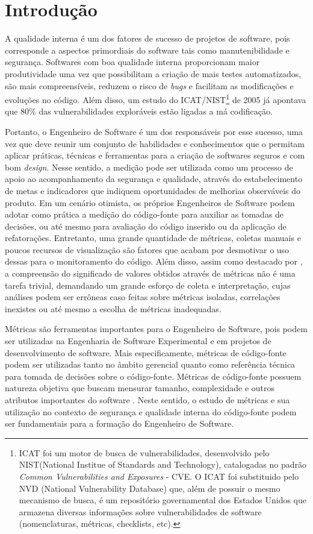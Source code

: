 \section{Introdução}
\label{introduction}

A qualidade interna é um dos fatores de sucesso de projetos de software, pois corresponde a aspectos primordiais do software tais como manutenibilidade e segurança. Softwares com boa qualidade interna proporcionam maior produtividade uma vez que possibilitam a criação de mais testes automatizados, são mais compreensíveis, reduzem o risco de \emph{bugs} e facilitam as modificações e evoluções no código. Além disso, um estudo do ICAT/NIST\footnote{ICAT foi um motor de busca de vulnerabilidades, desenvolvido pelo NIST(National Institue of Standards and Technology), catalogadas no padrão \emph{Common Vulnerabilities and Exposures} - CVE. O ICAT foi substituido pelo NVD (National Vulnerability Database) que, além de possuir o mesmo mecanismo de busca, é um repositório governamental dos Estados Unidos que armazena diversas informações sobre vulnerabilidades de software (nomenclaturas, métricas, checklists, etc).} de 2005 já apontava que 80\% das vulnerabilidades exploráveis estão ligadas a má codificação.

Portanto, o Engenheiro de Software é um dos responsáveis por esse sucesso, uma vez que deve reunir um conjunto de habilidades e conhecimentos que o permitam aplicar práticas, técnicas e ferramentas para a criação de softwares seguros e com bom \emph{design}. Nesse sentido, a medição pode ser utilizada como um processo de apoio ao acompanhamento da segurança e qualidade, através do estabelecimento de metas e indicadores que indiquem oportunidades de melhorias observáveis do produto. Em um cenário otimista,
os próprios Engenheiros de Software podem adotar como prática a medição do código-fonte para auxiliar as tomadas de decisões, ou até mesmo para avaliação do código inserido ou da aplicação de refatorações. Entretanto, uma grande quantidade de métricas, coletas manuais e poucos recursos de visualização são fatores que acabam por desmotivar o uso dessas para o monitoramento do código. Além disso, assim como destacado por \cite{chidamber1994}, a compreensão do significado de valores obtidos através de métricas não é uma tarefa trivial, demandando um grande esforço de coleta e interpretação, cujas análises podem ser errôneas caso feitas sobre métricas isoladas, correlações inexistes ou até mesmo a escolha de métricas inadequadas.

Métricas são ferramentas importantes para o Engenheiro de Software, pois podem ser utilizadas na Engenharia de Software Experimental \cite{hegedus2012} e em projetos de desenvolvimento de software. Mais especificamente, métricas de código-fonte podem ser utilizadas tanto no âmbito gerencial quanto como referência técnica para tomada de decisões sobre o código-fonte. Métricas de código-fonte possuem natureza objetiva que buscam mensurar tamanho, complexidade e outros atributos importantes do software \cite{henry1984kafura}\cite{troy1981zweben}\cite{yau1985zweben}\cite{systa2000}. Neste sentido, o estudo de métricas e sua utilização no contexto de segurança e qualidade interna do código-fonte podem ser fundamentais para a formação do Engenheiro de Software.

